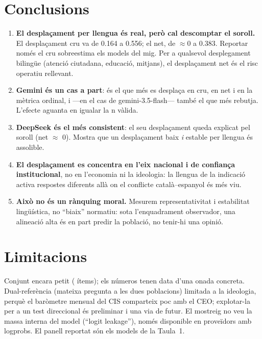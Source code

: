 \documentclass[10pt,twocolumn]{article}
\begin{document}
\section{Conclusions}
\begin{enumerate}
\item \textbf{El desplaçament per llengua és real, però cal descomptar el soroll.}
El desplaçament cru va de 0.164 a 0.556; el net, de $\approx$0 a 0.383. Reportar
només el cru sobreestima els models del mig. Per a qualsevol desplegament bilingüe
(atenció ciutadana, educació, mitjans), el desplaçament net és el risc operatiu
rellevant.
\item \textbf{Gemini és un cas a part}: és el que més es desplaça en cru, en net i
en la mètrica ordinal, i ---en el cas de gemini-3.5-flash--- també el que més
rebutja. L'efecte aguanta en igualar la n vàlida.
\item \textbf{DeepSeek és el més consistent}: el seu desplaçament queda explicat pel
soroll (net $\approx$ 0). Mostra que un desplaçament baix \emph{i} estable per
llengua és assolible.
\item \textbf{El desplaçament es concentra en l'eix nacional i de confiança
institucional}, no en l'economia ni la ideologia: la llengua de la indicació activa
respostes diferents allà on el conflicte català--espanyol és més viu.
\item \textbf{Això no és un rànquing moral.} Mesurem representativitat i estabilitat
lingüística, no ``biaix'' normatiu: sota l'enquadrament observador, una alineació
alta és en part predir la població, no tenir-hi una opinió.
\end{enumerate}

\section{Limitacions}
Conjunt encara petit (\nitems{} ítems); els números tenen data d'una onada concreta.
Dual-referència (mateixa pregunta a les dues poblacions) limitada a la ideologia,
perquè el baròmetre mensual del CIS comparteix poc amb el CEO; explotar-la per a un
test direccional és preliminar i una via de futur. El mostreig no veu la massa
interna del model (``logit leakage''), només disponible en proveïdors amb logprobs.
El panell reportat són els \nmodels{} models de la Taula~1.
\end{document}
